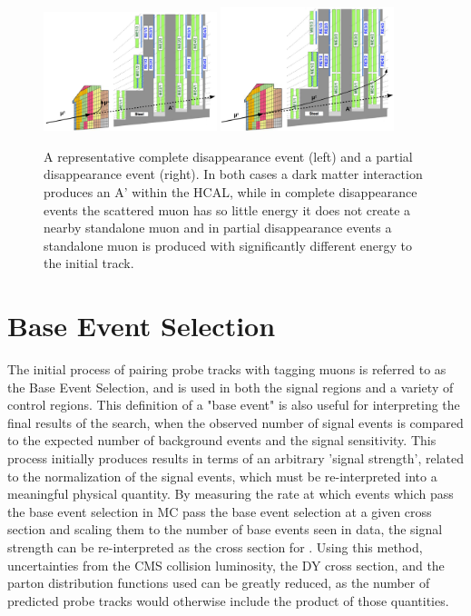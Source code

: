\begin{figure}[htpb]
	\centering
	\includegraphics[width=0.45\textwidth]{figures/comp_dis.pdf}
	\hspace{0.01\textwidth}
	\includegraphics[width=0.45\textwidth]{figures/part_dis.pdf}
	\caption[Example Complete and Partial Disappearance Events]{A representative complete disappearance event (left) and a partial disappearance event (right). In both cases a dark matter interaction produces an A' within the HCAL, while in complete disappearance events the scattered muon has so little energy it does not create a nearby standalone muon and in partial disappearance events a standalone muon is produced with significantly different energy to the initial track.}
	\label{fig:sigCatSketch}
\end{figure}

\section{Base Event Selection}
The initial process of pairing probe tracks with tagging muons is referred to as the Base Event Selection, and is used in both the signal regions and a variety of control regions.
This definition of a "base event" is also useful for interpreting the final results of the search, when the observed number of signal events is compared to the expected number of background events and the signal sensitivity.
This process initially produces results in terms of an arbitrary 'signal strength', related to the normalization of the signal events, which must be re-interpreted into a meaningful physical quantity.
By measuring the rate at which events which pass the base event selection in MC pass the base event selection at a given cross section and scaling them to the number of base events seen in data, the signal strength can be re-interpreted as the cross section for \dbrem.
Using this method, uncertainties from the CMS collision luminosity, the DY cross section, and the parton distribution functions used can be greatly reduced, as the number of predicted probe tracks would otherwise include the product of those quantities.


